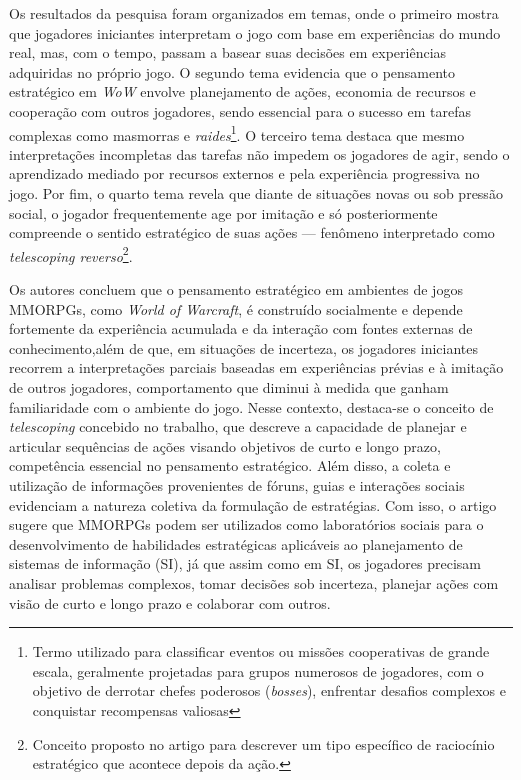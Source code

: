 Os resultados da pesquisa foram organizados em temas, onde o primeiro mostra que jogadores iniciantes interpretam o jogo com base em experiências do mundo real, mas, com o tempo, passam a basear suas decisões em experiências adquiridas no próprio jogo.
O segundo tema evidencia que o pensamento estratégico em \textit{WoW} envolve planejamento de ações, economia de recursos e cooperação com outros jogadores, sendo essencial para o sucesso em tarefas complexas como masmorras e \textit{raides}\footnote{Termo utilizado para classificar eventos ou missões cooperativas de grande escala, geralmente projetadas para grupos numerosos de jogadores, com o objetivo de derrotar chefes poderosos (\textit{bosses}), enfrentar desafios complexos e conquistar recompensas valiosas}.
O terceiro tema destaca que mesmo interpretações incompletas das tarefas não impedem os jogadores de agir, sendo o aprendizado mediado por recursos externos e pela experiência progressiva no jogo.
Por fim, o quarto tema revela que diante de situações novas ou sob pressão social, o jogador frequentemente age por imitação e só posteriormente compreende o sentido estratégico de suas ações — fenômeno interpretado como \textit{telescoping reverso}\footnote{Conceito proposto no artigo para descrever um tipo específico de raciocínio estratégico que acontece depois da ação.}.

Os autores concluem que o pensamento estratégico em ambientes de jogos MMORPGs, como \textit{World of Warcraft}, é construído socialmente e depende fortemente da experiência acumulada e da interação com fontes externas de conhecimento,além de que, em situações de incerteza, os jogadores iniciantes recorrem a interpretações parciais baseadas em experiências prévias e à imitação de outros jogadores, comportamento que diminui à medida que ganham familiaridade com o ambiente do jogo.
Nesse contexto, destaca-se o conceito de \textit{telescoping} concebido no trabalho, que descreve a capacidade de planejar e articular sequências de ações visando objetivos de curto e longo prazo, competência essencial no pensamento estratégico. Além disso, a coleta e utilização de informações provenientes de fóruns, guias e interações sociais evidenciam a natureza coletiva da formulação de estratégias.
Com isso, o artigo sugere que MMORPGs podem ser utilizados como laboratórios sociais para o desenvolvimento de habilidades estratégicas aplicáveis ao planejamento de sistemas de informação (SI), já que assim como em SI, os jogadores precisam analisar problemas complexos, tomar decisões sob incerteza, planejar ações com visão de curto e longo prazo e colaborar com outros.

